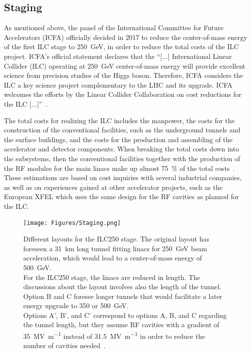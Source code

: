 \subsection{Staging}
\label{ILC:layout:staging}
As mentioned above, the panel of the International Committee for Future Accelerators (ICFA) officially decided in 2017 to reduce the center-of-mass energy of the first ILC stage to \SI{250}{\GeV}, in order to reduce the total costs of the ILC project.
ICFA's official statement declares that the ``[...] International Linear Collider (ILC) operating at \SI{250}{\GeV} center-of-mass energy will provide excellent science from precision studies of the Higgs boson.
Therefore, ICFA considers the ILC a key science project complementary to the LHC and its upgrade.
ICFA welcomes the efforts by the Linear Collider Collaboration on cost reductions for the ILC [...]''~\cite{ICFA_Statement}.

The total costs for realizing the ILC includes the manpower, the costs for the construction of the conventional facilities, such as the underground tunnels and the surface buildings, and the costs for the production and assembling of the accelerator and detector components.
When breaking the total costs down into the subsystems, then the conventional facilities together with the production of the RF modules for the main linacs make up almost \SI{75}{\percent} of the total costs~\cite[p. 20f]{TDR1}.
These estimations are based on cost inquiries with several industrial companies, as well as on experiences gained at other accelerator projects, such as the European XFEL which uses the same design for the RF cavities as planned for the ILC.
\begin{figure}
\centering
\texttt{[image: Figures/Staging.png]}
\caption[Different accelerator layouts for the ILC250 stage]{Different layouts for the ILC250 stage.
The original layout has foreseen a \SI{31}{\kilo\meter} long tunnel fitting linacs for \SI{250}{\GeV} beam acceleration, which would lead to a center-of-mass energy of \SI{500}{\GeV}.
\\For the ILC250 stage, the linacs are reduced in length.
The discussions about the layout involves also the length of the tunnel.
Option B and C foresee longer tunnels that would facilitate a later energy upgrade to 350 or \SI[detect-all]{500}{\GeV}.\\
Options A', B', and C' correspond to options A, B, and C regarding the tunnel length, but they assume RF cavities with a gradient of \SI[detect-all]{35}{\mega\volt\per\meter} instead of \SI[detect-all]{31.5}{\mega\volt\per\meter} in order to reduce the number of cavities needed~\cite[p. 19]{Staging}.}
\label{fig:Staging}
\end{figure}

